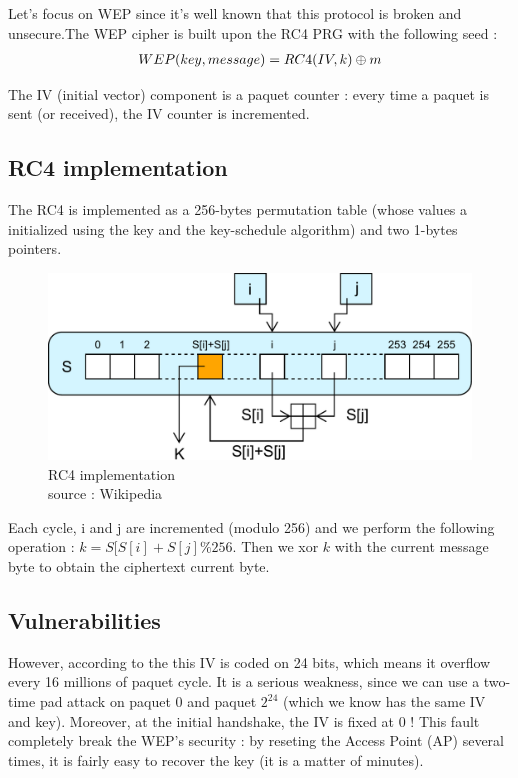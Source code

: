 Let's focus on WEP since it's well known that this protocol is broken and unsecure.The WEP cipher is built upon the RC4 PRG  with the following seed : 
\begin{align}
     WEP(key,message) = RC4(IV,k) \oplus m 
\end{align}

The IV (initial vector) component is a paquet counter : every time a paquet is sent (or received), the IV counter is incremented.

\subsection{RC4 implementation}

The RC4 is implemented as a 256-bytes permutation table (whose values a initialized using the key and the key-schedule algorithm) and two 1-bytes pointers. 

\begin{figure}[hb!]
    \centering
       \includegraphics[width=\textwidth]{images/RC4.pdf}
	\caption{RC4 implementation \\ source : Wikipedia}
	\label{fig:RC4}
\end{figure}

Each cycle, i and j are incremented (modulo 256) and we perform the following operation : $k = S[ S[i] + S[j] \% 256$. Then we xor $k$ with the current message byte to obtain the ciphertext current byte.

\subsection{Vulnerabilities}
However, according to the  this IV is coded on 24 bits, which means it overflow every 16 millions of paquet cycle. 
It is a serious weakness, since we can use a two-time pad attack on paquet $0$ and paquet $2^24$ (which we know has the same IV and key). Moreover, at the initial handshake, the IV is fixed at 0 ! This fault completely break the WEP's security : by reseting the Access Point (AP) several times, it is fairly easy to recover the key (it is a matter of minutes).\\

